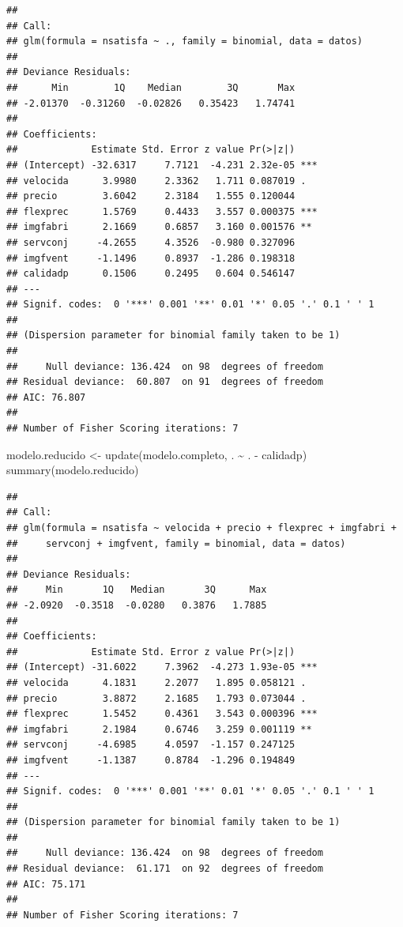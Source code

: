 \documentclass[
]{book}
\newenvironment{Shaded}{\begin{snugshade}}{\end{snugshade}}
\newcommand{\FunctionTok}[1]{\textcolor[rgb]{0.00,0.00,0.00}{#1}}
\newcommand{\NormalTok}[1]{#1}
\newcommand{\OtherTok}[1]{\textcolor[rgb]{0.56,0.35,0.01}{#1}}
\newcommand{\SpecialCharTok}[1]{\textcolor[rgb]{0.00,0.00,0.00}{#1}}
\theoremstyle{break}
\theoremstyle{nonumberplain}
\begin{document}
\begin{verbatim}
## 
## Call:
## glm(formula = nsatisfa ~ ., family = binomial, data = datos)
## 
## Deviance Residuals: 
##      Min        1Q    Median        3Q       Max  
## -2.01370  -0.31260  -0.02826   0.35423   1.74741  
## 
## Coefficients:
##             Estimate Std. Error z value Pr(>|z|)    
## (Intercept) -32.6317     7.7121  -4.231 2.32e-05 ***
## velocida      3.9980     2.3362   1.711 0.087019 .  
## precio        3.6042     2.3184   1.555 0.120044    
## flexprec      1.5769     0.4433   3.557 0.000375 ***
## imgfabri      2.1669     0.6857   3.160 0.001576 ** 
## servconj     -4.2655     4.3526  -0.980 0.327096    
## imgfvent     -1.1496     0.8937  -1.286 0.198318    
## calidadp      0.1506     0.2495   0.604 0.546147    
## ---
## Signif. codes:  0 '***' 0.001 '**' 0.01 '*' 0.05 '.' 0.1 ' ' 1
## 
## (Dispersion parameter for binomial family taken to be 1)
## 
##     Null deviance: 136.424  on 98  degrees of freedom
## Residual deviance:  60.807  on 91  degrees of freedom
## AIC: 76.807
## 
## Number of Fisher Scoring iterations: 7
\end{verbatim}

\begin{Shaded}
\begin{Highlighting}[]
\NormalTok{modelo.reducido }\OtherTok{\textless{}{-}} \FunctionTok{update}\NormalTok{(modelo.completo, . }\SpecialCharTok{\textasciitilde{}}\NormalTok{ . }\SpecialCharTok{{-}}\NormalTok{ calidadp)}
\FunctionTok{summary}\NormalTok{(modelo.reducido)}
\end{Highlighting}
\end{Shaded}

\begin{verbatim}
## 
## Call:
## glm(formula = nsatisfa ~ velocida + precio + flexprec + imgfabri + 
##     servconj + imgfvent, family = binomial, data = datos)
## 
## Deviance Residuals: 
##     Min       1Q   Median       3Q      Max  
## -2.0920  -0.3518  -0.0280   0.3876   1.7885  
## 
## Coefficients:
##             Estimate Std. Error z value Pr(>|z|)    
## (Intercept) -31.6022     7.3962  -4.273 1.93e-05 ***
## velocida      4.1831     2.2077   1.895 0.058121 .  
## precio        3.8872     2.1685   1.793 0.073044 .  
## flexprec      1.5452     0.4361   3.543 0.000396 ***
## imgfabri      2.1984     0.6746   3.259 0.001119 ** 
## servconj     -4.6985     4.0597  -1.157 0.247125    
## imgfvent     -1.1387     0.8784  -1.296 0.194849    
## ---
## Signif. codes:  0 '***' 0.001 '**' 0.01 '*' 0.05 '.' 0.1 ' ' 1
## 
## (Dispersion parameter for binomial family taken to be 1)
## 
##     Null deviance: 136.424  on 98  degrees of freedom
## Residual deviance:  61.171  on 92  degrees of freedom
## AIC: 75.171
## 
## Number of Fisher Scoring iterations: 7
\end{verbatim}
\end{document}

